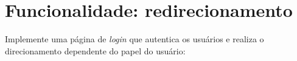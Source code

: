 















\section*{Funcionalidade: redirecionamento}

\vspace{0.3cm}

Implemente  uma página  de {\it  login} que  autentica os  usuários e  realiza o
direcionamento dependente do papel do usuário: 

